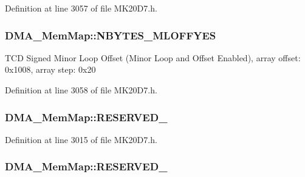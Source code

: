 Definition at line 3057 of file M\+K20\+D7.\+h.

\subsubsection[{\texorpdfstring{N\+B\+Y\+T\+E\+S\+\_\+\+M\+L\+O\+F\+F\+Y\+ES}{NBYTES_MLOFFYES}}]{ D\+M\+A\+\_\+\+Mem\+Map\+::\+N\+B\+Y\+T\+E\+S\+\_\+\+M\+L\+O\+F\+F\+Y\+ES}\hypertarget{struct_d_m_a___mem_map_aa99ffa54a462f1c42ea1feb2e5420c73}{}\label{struct_d_m_a___mem_map_aa99ffa54a462f1c42ea1feb2e5420c73}
T\+CD Signed Minor Loop Offset (Minor Loop and Offset Enabled), array offset\+: 0x1008, array step\+: 0x20 

Definition at line 3058 of file M\+K20\+D7.\+h.

\subsubsection[{\texorpdfstring{R\+E\+S\+E\+R\+V\+E\+D\+\_\+0}{RESERVED_0}}]{ D\+M\+A\+\_\+\+Mem\+Map\+::\+R\+E\+S\+E\+R\+V\+E\+D\+\_}\hypertarget{struct_d_m_a___mem_map_ab577c720104f909159f824bc5c7d6550}{}\label{struct_d_m_a___mem_map_ab577c720104f909159f824bc5c7d6550}


Definition at line 3015 of file M\+K20\+D7.\+h.

\subsubsection[{\texorpdfstring{R\+E\+S\+E\+R\+V\+E\+D\+\_\+1}{RESERVED_1}}]{ D\+M\+A\+\_\+\+Mem\+Map\+::\+R\+E\+S\+E\+R\+V\+E\+D\+\_}\hypertarget{struct_d_m_a___mem_map_ac8aa0a62f13eef051c84cb582a8ec821}{}\label{struct_d_m_a___mem_map_ac8aa0a62f13eef051c84cb582a8ec821}


